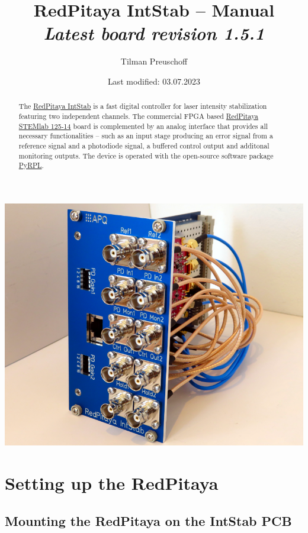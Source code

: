 \documentclass[twoside,a4paper]{refart}
\title{RedPitaya IntStab -- Manual\\
	\textit{\normalsize{Latest board revision 1.5.1}}}
\author{Tilman Preuschoff}
\date{Last modified: 03.07.2023}
\begin{document}
\maketitle
\begin{maxipage}
	\includegraphics[width=\textwidth]{fig/intstab.png}
\end{maxipage}
\begin{abstract}
	The \href{https://github.com/TU-Darmstadt-APQ/RedPitaya-IntStab}{RedPitaya IntStab} is a fast digital controller for laser intensity stabilization featuring two independent channels. The commercial FPGA based \href{https://www.redpitaya.com/f130/STEMlab-board}{RedPitaya STEMlab 125-14} board is complemented by an analog interface that provides all necessary functionalities -- such as an input stage producing an error signal from a reference signal and a photodiode signal, a buffered control output and additonal monitoring outputs. The device is operated with the open-source software package \href{https://pyrpl.readthedocs.io/en/latest/}{PyRPL}.  
\end{abstract}
\tableofcontents


\section{Setting up the RedPitaya}

\subsection{Mounting the RedPitaya on the IntStab PCB}
\end{document}

